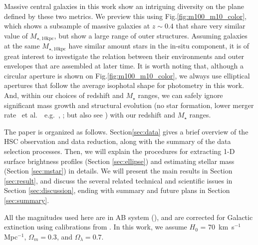 \documentclass{emulateapj}
\def\etal{{\ et al.~}}
\def\mstar{{$M_{\star}$}}
\def\minn{{$M_{\star,10\mathrm{kpc}}$}}
\newcommand{\update}[1]{\textcolor{Bittersweet}{#1}}
\begin{document}
\begin{CJK*}{UTF8}{gbsn}
    \update{Massive central galaxies in this work show an intriguing diversity on the 
    plane defined by these two metrics.  
    We preview this using Fig.\ref{fig:m100_m10_color}, which shows a subsample of 
    massive galaxies at $z\sim 0.4$ that share very similar value of \minn{}, but show 
    a large range of outer structures. 
    Assuming galaxies at the same \minn{} have similar amount stars in the in-situ 
    component, it is of great interest to investigate the relation between their 
    environments and outer envelopes that are assembled at later time. 
    It is worth noting that, although a circular aperture is shown on 
    Fig.\ref{fig:m100_m10_color}, we always use elliptical apertures that follow the 
    average isophotal shape for photometry in this work.}
    And, within our choices of redshift and \mstar{} ranges, we can safely ignore 
    significant mass growth and structural evolution 
    (no star formation, lower merger rate \etal~e.g.\ \citealt{Bellstedt2016},
    \citealt{Inagaki2015}; but also see \citealt{Bai2014}) 
    with our redshift and \mstar{} ranges. 

    The paper is organized as follows. Section\ref{sec:data} gives a brief overview of 
    the HSC observation and data reduction, along with the summary of the data selection
    processes.  
    Then, we will explain the procedures for extracting 1-D surface brightness profiles 
    (Section \ref{sec:ellipse}) and estimating stellar mass (Section \ref{sec:mstar}) in
    details.   
    We will present the main results in Section \ref{sec:result}, and discuss the several 
    related technical and scientific issues in Section \ref{sec:discussion}, ending with
    summary and future plans in Section \ref{sec:summary}.

    All the magnitudes used here are in AB system (\citealt{Oke1983}), and are corrected 
    for Galactic extinction using calibrations from \citet{Schlafly11}.
    In this work, we assume $H_0$ = 70~km~s$^{-1}$ Mpc$^{-1}$, ${\Omega}_m=0.3$, 
    and ${\Omega}_{\lambda}=0.7$. 


\end{CJK*}
\end{document}
